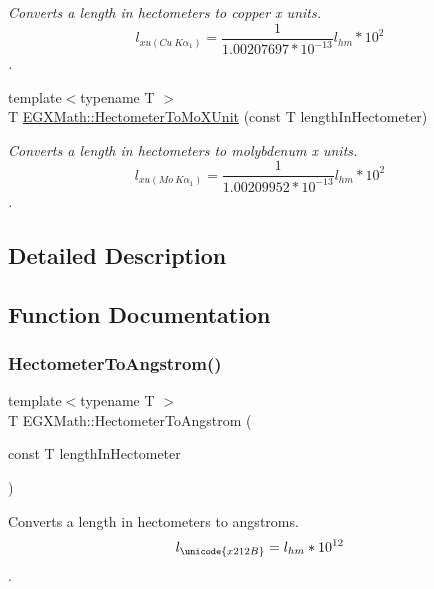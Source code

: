 \begin{DoxyCompactItemize}
\begin{DoxyCompactList}\small\item\em Converts a length in hectometers to copper x units. \[ l_{xu(Cu\ K\alpha_1)}= \frac{1}{1.00207697*10^{-13}} l_{hm} * 10^{2}\]. \end{DoxyCompactList}\item 
{\footnotesize template$<$typename T $>$ }\\T \mbox{\hyperlink{group___e_g_x_math-_conversions-_length_conversions-_hectometer-_non-_s_i_gac2840604040746ae9a4c51fd1bb3e6f6}{E\+G\+X\+Math\+::\+Hectometer\+To\+Mo\+X\+Unit}} (const T length\+In\+Hectometer)
\begin{DoxyCompactList}\small\item\em Converts a length in hectometers to molybdenum x units. \[ l_{xu(Mo\ K\alpha_1)}=\frac{1}{1.00209952*10^{-13}} l_{hm} * 10^{2}\]. \end{DoxyCompactList}\end{DoxyCompactItemize}


\subsection{Detailed Description}


\subsection{Function Documentation}
\mbox{\label{group___e_g_x_math-_conversions-_length_conversions-_hectometer-_non-_s_i_gad1296c0169aa8a99802a30b65a2ea516}} 
\subsubsection{\texorpdfstring{Hectometer\+To\+Angstrom()}{HectometerToAngstrom()}}
{\footnotesize\ttfamily template$<$typename T $>$ \\
T E\+G\+X\+Math\+::\+Hectometer\+To\+Angstrom (\begin{DoxyParamCaption}\item[{const T}]{length\+In\+Hectometer }\end{DoxyParamCaption})}



Converts a length in hectometers to angstroms. \[ l_{\unicode{x212B}}=l_{hm} * 10^{12} \]. 

